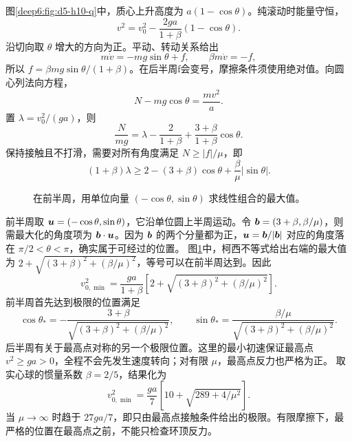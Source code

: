 \begin{solution}
图\ref{deep6:fig:d5-h10-q}中，质心上升高度为 $a(1-\cos\theta)$。纯滚动时能量守恒，
\[
v^2=v_0^2-\frac{2ga}{1+\beta}(1-\cos\theta).
\]
沿切向取 $\theta$ 增大的方向为正。平动、转动关系给出
\[
m\dot v=-mg\sin\theta+f,\qquad
\beta m\dot v=-f,
\]
所以 $f=\beta mg\sin\theta/(1+\beta)$。在后半周f会变号，摩擦条件须使用绝对值。向圆心列法向方程，
\[
N-mg\cos\theta=\frac{mv^2}a.
\]
置 $\lambda=v_0^2/(ga)$，则
\[
\frac{N}{mg}=\lambda-\frac2{1+\beta}
+\frac{3+\beta}{1+\beta}\cos\theta.
\]
保持接触且不打滑，需要对所有角度满足 $N\ge |f|/\mu$，即
\[
(1+\beta)\lambda\ge
2-(3+\beta)\cos\theta+\frac\beta\mu|\sin\theta|.
\]
\begin{figure}[H]\centering
{}
\caption{在前半周，用单位向量 $(-\cos\theta,\sin\theta)$ 求线性组合的最大值。}\label{deep6:fig:d5-h10-s}
\end{figure}
前半周取 $\bm{u}=(-\cos\theta,\sin\theta)$，它沿单位圆上半周运动。令 $\bm{b}=(3+\beta,\beta/\mu)$，则需最大化的角度项为 $\bm{b}\cdot\bm{u}$。因为 $\bm{b}$ 的两个分量都为正，$\bm{u}=\bm{b}/|\bm{b}|$ 对应的角度落在 $\pi/2<\theta<\pi$，确实属于可经过的位置。
图\ref{deep6:fig:d5-h10-s}中，柯西不等式给出右端的最大值为
$2+\sqrt{(3+\beta)^2+(\beta/\mu)^2}$，等号可以在前半周达到。因此
\[
\boxed{v_{0,\min}^2=
\frac{ga}{1+\beta}\left[2+\sqrt{(3+\beta)^2+(\beta/\mu)^2}\right].}
\]
前半周首先达到极限的位置满足
\[
\cos\theta_*=-\frac{3+\beta}{\sqrt{(3+\beta)^2+(\beta/\mu)^2}},\qquad
\sin\theta_*=\frac{\beta/\mu}{\sqrt{(3+\beta)^2+(\beta/\mu)^2}}.
\]
后半周有关于最高点对称的另一个极限位置。这里的最小初速保证最高点 $v^2\ge ga>0$，全程不会先发生速度转向；对有限 $\mu$，最高点反力也严格为正。
取实心球的惯量系数 $\beta=2/5$，结果化为
\[
v_{0,\min}^2=\frac{ga}{7}\left[10+\sqrt{289+4/\mu^2}\right].
\]
当 $\mu\to\infty$ 时趋于 $27ga/7$，即只由最高点接触条件给出的极限。有限摩擦下，最严格的位置在最高点之前，不能只检查环顶反力。
\end{solution}


